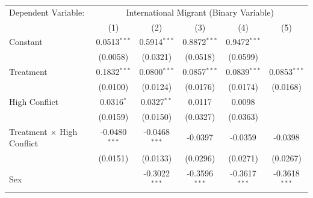\begingroup
\centering
\renewcommand{\arraystretch}{0.75}   %
\setlength{\aboverulesep}{0pt}       %
\setlength{\belowrulesep}{0pt} 
\begin{tabular}{lccccc}
   \tabularnewline \midrule \midrule
   Dependent Variable: & \multicolumn{5}{c}{International Migrant (Binary Variable)}\\
                                                       
                                               & (1)             & (2)                            & (3)                     & (4)                     & (5)\\  
   \midrule
    Constant                                          & 0.0513$^{***}$  & 0.5914$^{***}$                 & 0.8872$^{***}$          & 0.9472$^{***}$          &   \\   
                                                     & (0.0058)        & (0.0321)                       & (0.0518)                & (0.0599)                &   \\   
   Treatment                                         & 0.1832$^{***}$  & 0.0800$^{***}$                 & 0.0857$^{***}$          & 0.0839$^{***}$          & 0.0853$^{***}$\\   
                                                     & (0.0100)        & (0.0124)                       & (0.0176)                & (0.0174)                & (0.0168)\\   
   High Conflict                        & 0.0316$^{*}$    & 0.0327$^{**}$                  & 0.0117                  & 0.0098                  &   \\   
                                                     & (0.0159)        & (0.0150)                       & (0.0327)                & (0.0363)                &   \\   
   Treatment $\times$ High Conflict     & -0.0480$^{***}$ & -0.0468$^{***}$                & -0.0397                 & -0.0359                 & -0.0398\\   
                                                     & (0.0151)        & (0.0133)                       & (0.0296)                & (0.0271)                & (0.0267)\\   
   Sex                                               &                 & -0.3022$^{***}$                & -0.3596$^{***}$         & -0.3617$^{***}$         & -0.3618$^{***}$\\   

\end{tabular}
